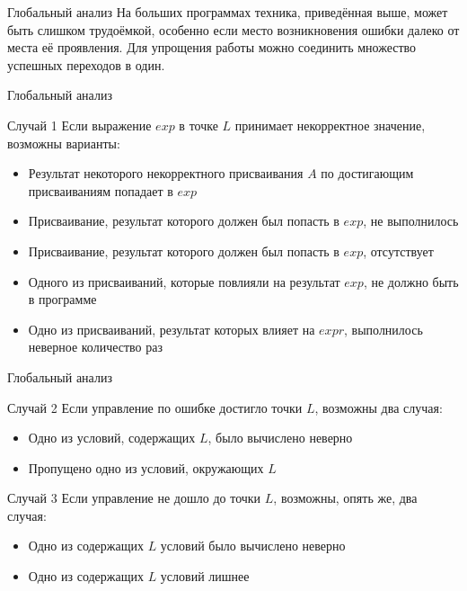 \documentclass[presentation]{beamer}
\begin{document}
\begin{frame}[label={sec:org635bb0d}]{Глобальный анализ}
На больших программах техника, приведённая выше, может быть слишком трудоёмкой, особенно если место возникновения ошибки далеко от места её проявления. Для упрощения работы
можно соединить множество успешных переходов в один.
\end{frame}
\begin{frame}[label={sec:org07c0cc0}]{Глобальный анализ}
\begin{block}{Случай 1}
Если выражение \(exp\) в точке \(L\) принимает некорректное значение, возможны варианты:
\begin{itemize}
\item Результат некоторого некорректного присваивания \(A\) по достигающим присваиваниям попадает в \(exp\)
\item Присваивание, результат которого должен был попасть в \(exp\), не выполнилось
\item Присваивание, результат которого должен был попасть в \(exp\), отсутствует
\item Одного из присваиваний, которые повлияли на результат \(exp\), не должно быть в программе
\item Одно из присваиваний, результат которых влияет на \(expr\), выполнилось неверное количество раз
\end{itemize}
\end{block}
\end{frame}
\begin{frame}[label={sec:org77d8b79}]{Глобальный анализ}
\begin{block}{Случай 2}
Если управление по ошибке достигло точки \(L\), возможны два случая:
\begin{itemize}
\item Одно из условий, содержащих \(L\), было вычислено неверно
\item Пропущено одно из условий, окружающих \(L\)
\end{itemize}
\end{block}
\begin{block}{Случай 3}
Если управление не дошло до точки \(L\), возможны, опять же, два случая:
\begin{itemize}
\item Одно из содержащих \(L\) условий было вычислено неверно
\item Одно из содержащих \(L\) условий лишнее
\end{itemize}
\end{block}
\end{frame}
\end{document}
